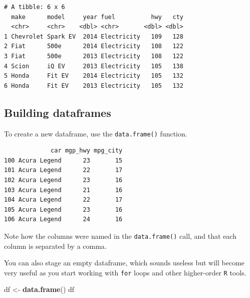\documentclass[
]{book}
\newenvironment{Shaded}{\begin{snugshade}}{\end{snugshade}}
\newcommand{\DecValTok}[1]{\textcolor[rgb]{0.00,0.00,0.81}{#1}}
\newcommand{\KeywordTok}[1]{\textcolor[rgb]{0.13,0.29,0.53}{\textbf{#1}}}
\newcommand{\NormalTok}[1]{#1}
\newcommand{\OperatorTok}[1]{\textcolor[rgb]{0.81,0.36,0.00}{\textbf{#1}}}
\newcommand{\StringTok}[1]{\textcolor[rgb]{0.31,0.60,0.02}{#1}}
\begin{document}
\begin{Shaded}
\end{Shaded}

\begin{verbatim}
# A tibble: 6 x 6
  make      model     year fuel          hwy   cty
  <chr>     <chr>    <dbl> <chr>       <dbl> <dbl>
1 Chevrolet Spark EV  2014 Electricity   109   128
2 Fiat      500e      2014 Electricity   108   122
3 Fiat      500e      2013 Electricity   108   122
4 Scion     iQ EV     2013 Electricity   105   138
5 Honda     Fit EV    2014 Electricity   105   132
6 Honda     Fit EV    2013 Electricity   105   132
\end{verbatim}

\hypertarget{building-dataframes}{%
\subsection*{Building dataframes}\label{building-dataframes}}

To create a new dataframe, use the \texttt{data.frame()} function.

\begin{verbatim}
             car mgp_hwy mpg_city
100 Acura Legend      23       15
101 Acura Legend      22       17
102 Acura Legend      23       16
103 Acura Legend      21       16
104 Acura Legend      22       17
105 Acura Legend      23       16
106 Acura Legend      24       16
\end{verbatim}

Note how the columns were named in the \texttt{data.frame()} call, and that each column is separated by a comma.

You can also stage an empty dataframe, which sounds useless but will become very useful as you start working with \texttt{for} loops and other higher-order \texttt{R} tools.

\begin{Shaded}
\begin{Highlighting}[]
\NormalTok{df <-}\StringTok{ }\KeywordTok{data.frame}\NormalTok{()}
\NormalTok{df}
\end{Highlighting}
\end{Shaded}
\end{document}
